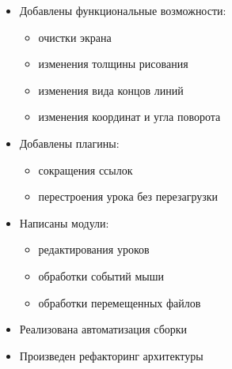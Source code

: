 \begin{itemize}
  \item Добавлены функциональные возможности:
	\begin{itemize}
	  \item очистки экрана
	  \item изменения толщины рисования
	  \item изменения вида концов линий
	  \item изменения координат и угла поворота
	\end{itemize}
  \item Добавлены плагины:
  	\begin{itemize}
  	  \item сокращения ссылок
  	  \item перестроения урока без перезагрузки
  	\end{itemize}
  \item Написаны модули:
  	\begin{itemize}
  	  \item редактирования уроков
  	  \item обработки событий мыши
  	  \item обработки перемещенных файлов
  	\end{itemize}
  \item Реализована автоматизация сборки
  \item Произведен рефакторинг архитектуры
  
\end{itemize}

\clearpage